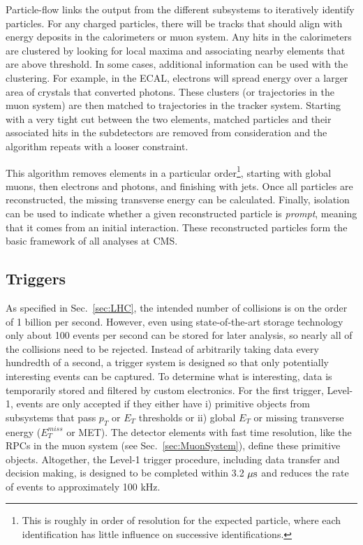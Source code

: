 Particle-flow links the output from the different subsystems to iteratively identify particles. For any charged particles, there will be tracks that should align with energy deposits in the calorimeters or muon system. Any hits in the calorimeters are clustered by looking for local maxima and associating nearby elements that are above threshold. In some cases, additional information can be used with the clustering. For example, in the ECAL, electrons will spread energy over a larger area of crystals that converted photons. These clusters (or trajectories in the muon system) are then matched to trajectories in the tracker system. Starting with a very tight cut between the two elements, matched particles and their associated hits in the subdetectors are removed from consideration and the algorithm repeats with a looser constraint.

This algorithm removes elements in a particular order\footnote{This is roughly in order of resolution for the expected particle, where each identification has little influence on successive identifications.}, starting with global muons, then electrons and photons, and finishing with jets. Once all particles are reconstructed, the missing transverse energy can be calculated. Finally, isolation can be used to indicate whether a given reconstructed particle is \textit{prompt}, meaning that it comes from an initial interaction. These reconstructed particles form the basic framework of all analyses at CMS. 

\subsection{Triggers}
\label{sec:Triggers}

As specified in Sec.~\ref{sec:LHC}, the intended number of collisions is on the order of 1 billion per second. However, even using state-of-the-art storage technology only about 100 events per second can be stored for later analysis, so nearly all of the collisions need to be rejected. Instead of arbitrarily taking data every hundredth of a second, a trigger system is designed so that only potentially interesting events can be captured. To determine what is interesting, data is temporarily stored and filtered by custom electronics. For the first trigger, Level-1, events are only accepted if they either have i) primitive objects from subsystems that pass $p_T$ or $E_T$ thresholds or ii) global $E_T$ or missing transverse energy ($E_T^{miss}$ or MET). The detector elements with fast time resolution, like the RPCs in the muon system (see Sec.~\ref{sec:MuonSystem}), define these primitive objects. Altogether, the Level-1 trigger procedure, including data transfer and decision making, is designed to be completed within 3.2 $\mu\rm{s}$ and reduces the rate of events to approximately 100 kHz.

